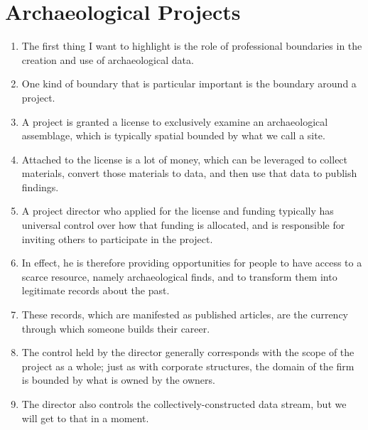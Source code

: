 \documentclass{article}
\begin{document}
\section{Archaeological Projects}
\begin{enumerate}
  \item The first thing I want to highlight is the role of professional boundaries in the creation and use of archaeological data.
  \item One kind of boundary that is particular important is the boundary around a project.
  \item A project is granted a license to exclusively examine an archaeological assemblage, which is typically spatial bounded by what we call a site.
  \item Attached to the license is a lot of money, which can be leveraged to collect materials, convert those materials to data, and then use that data to publish findings.
  \item A project director who applied for the license and funding typically has universal control over how that funding is allocated, and is responsible for inviting others to participate in the project.
  \item In effect, he is therefore providing opportunities for people to have access to a scarce resource, namely archaeological finds, and to transform them into legitimate records about the past.
  \item These records, which are manifested as published articles, are the currency through which someone builds their career.
  \item The control held by the director generally corresponds with the scope of the project as a whole; just as with corporate structures, the domain of the firm is bounded by what is owned by the owners.
  \item The director also controls the collectively-constructed data stream, but we will get to that in a moment.
\end{enumerate}
\end{document}
